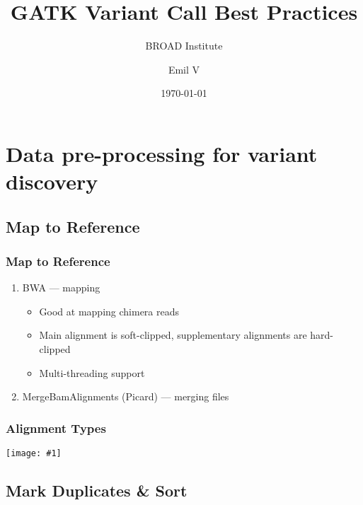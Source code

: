 \documentclass{beamer}
\title{GATK Variant Call Best Practices}
\subtitle{BROAD Institute}
\author{Emil V}
\institute{Institute of Cytology \& Genetics, SB RAS}
\date{\today}
\newcommand {\framedgraphic}[1] {
\begin{center}
\texttt{[image: \#1]}
\end{center}
}
\begin{document}
\begin{frame}
\titlepage
\end{frame}

\section{Data pre-processing for variant discovery}

\subsection{Map to Reference}

\begin{frame}
\frametitle{Map to Reference}

\begin{enumerate}
\item BWA --- mapping
\begin{itemize}
\item Good at mapping chimera reads
\item Main alignment is soft-clipped, supplementary alignments are hard-clipped
\item Multi-threading support 
\end{itemize}
\item MergeBamAlignments (Picard) --- merging files
\end{enumerate}

\end{frame}

\begin{frame}
\frametitle{Alignment Types}
\framedgraphic{cigar.png}
\end{frame}

\subsection{Mark Duplicates \& Sort}
\end{document}
